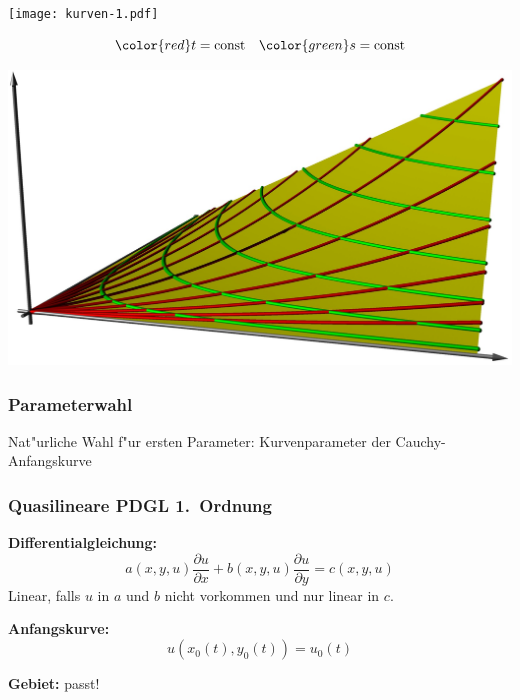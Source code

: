 \documentclass[handout]{beamer}
\begin{document}
\begin{frame}
\frametitle{}
\begin{center}
\texttt{[image: kurven-1.pdf]}
\end{center}
\[
\color{red} t=\text{const}
\quad
\color{green} s=\text{const}
\]
\end{frame}

\begin{frame}
\begin{center}
\includegraphics[width=\hsize]{surface.jpg}
\end{center}
\end{frame}


\begin{frame}
\frametitle{Parameterwahl}
Nat"urliche Wahl f"ur ersten Parameter: Kurvenparameter der Cauchy-Anfangskurve
\end{frame}

\begin{frame}
\frametitle{Quasilineare PDGL 1.~Ordnung}
{\bf Differentialgleichung:}
\[
a(x,y,u)\frac{\partial u}{\partial x}+b(x,y,u)\frac{\partial u}{\partial y}
=c(x,y,u)
\]
\pause
Linear, falls $u$ in $a$ und $b$ nicht vorkommen und nur linear in $c$.
\pause

\medskip

{\bf Anfangskurve:}
\pause
\[
u(x_0(t),y_0(t))=u_0(t)
\]
\pause

\smallskip

{\bf Gebiet:} \pause passt!
\end{frame}
\end{document}
